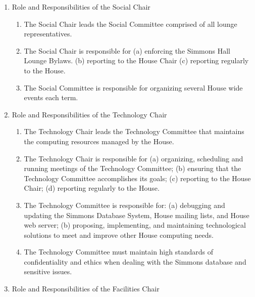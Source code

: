 \documentclass[letterpaper]{article}
\begin{document}
\begin{enumerate}
\begin{enumerate}
\begin{enumerate}
\item All business of each committee is discussed at meetings that are
open and announced to all members of the committee, and preferably
announced to all Members of the House. Committees may encourage
discussion outside of meetings; however, all modes of discussion must
allow for participation from every member of the committee.
\item Committee meetings should be held at appropriate times given the
particular topic of the committee{\textquotesingle}s attention.
Committee meetings should typically occur once each month, unless there
is no business to be discussed at that time.
\item Committees make decisions by group consensus or by majority vote.
No decisions are made until after the full membership of the Committee
is given a chance to comment and/or vote. Committee decisions are
reported to the House by the Committee Chair. If any member of a
committee disputes a decision reported by the Committee Chair, the
Chair of the House may call a vote of the committee membership.
\end{enumerate}
\item Role and Responsibilities of the Social Chair

\begin{enumerate}
\item The Social Chair leads the Social Committee comprised of all
lounge representatives. 
\item The Social Chair is responsible for (a) enforcing the
{\textquotedbl}Simmons Hall Lounge Bylaws.{\textquotedbl} (b) reporting
to the House Chair (c) reporting regularly to the House.
\item The Social Committee is responsible for organizing several House
wide events each term.
\end{enumerate}
\item Role and Responsibilities of the Technology Chair 

\begin{enumerate}
\item The Technology Chair leads the Technology Committee that maintains
the computing resources managed by the House. 
\item The Technology Chair is responsible for (a) organizing, scheduling
and running meetings of the Technology Committee; (b) ensuring that the
Technology Committee accomplishes its goals; (c) reporting to the House
Chair; (d) reporting regularly to the House.
\item The Technology Committee is responsible for: (a) debugging and
updating the Simmons Database System, House mailing lists, and House
web server; (b) proposing, implementing, and maintaining technological
solutions to meet and improve other House computing needs.
\item The Technology Committee must maintain high standards of
confidentiality and ethics when dealing with the Simmons database and
sensitive issues.
\end{enumerate}
\item Role and Responsibilities of the Facilities Chair 


\end{enumerate}
\end{enumerate}
\end{document}
